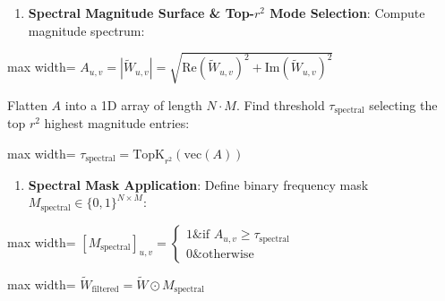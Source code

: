\begin{enumerate}
\item \textbf{Spectral Magnitude Surface \& Top-$r^2$ Mode Selection}:
Compute magnitude spectrum:
\end{enumerate}
\begin{center}
\begin{adjustbox}{max width=\columnwidth}
$\displaystyle
A_{u, v} = \left| \widetilde{W}_{u, v} \right| = \sqrt{ \text{Re}\left(\widetilde{W}_{u, v}\right)^2 + \text{Im}\left(\widetilde{W}_{u, v}\right)^2 }
$
\end{adjustbox}
\end{center}
Flatten $A$ into a 1D array of length $N \cdot M$. Find threshold $\tau_{\text{spectral}}$ selecting the top $r^2$ highest magnitude entries:
\begin{center}
\begin{adjustbox}{max width=\columnwidth}
$\displaystyle
\tau_{\text{spectral}} = \text{TopK}_{r^2}\left( \text{vec}(A) \right)
$
\end{adjustbox}
\end{center}

\begin{enumerate}
\item \textbf{Spectral Mask Application}:
Define binary frequency mask $M_{\text{spectral}} \in \{0, 1\}^{N \times M}$:
\end{enumerate}
\begin{center}
\begin{adjustbox}{max width=\columnwidth}
$\displaystyle
[M_{\text{spectral}}]_{u, v} = \begin{cases} 1 \& \text{if } A_{u, v} \ge \tau_{\text{spectral}} \\ 0 \& \text{otherwise} \end{cases}
$
\end{adjustbox}
\end{center}
\begin{center}
\begin{adjustbox}{max width=\columnwidth}
$\displaystyle
\widetilde{W}_{\text{filtered}} = \widetilde{W} \odot M_{\text{spectral}}
$
\end{adjustbox}
\end{center}

